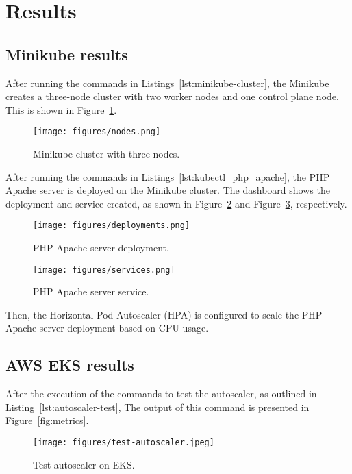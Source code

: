 \section{Results}
\subsection{Minikube results}
After running the commands in Listings~\ref{lst:minikube-cluster}, the Minikube creates a three-node cluster with two worker nodes and one control plane node.
This is shown in Figure~\ref{fig:minikube-cluster}.

\begin{figure}[!htbp]
  \centering
  \texttt{[image: figures/nodes.png]}
  \caption{Minikube cluster with three nodes.}
  \label{fig:minikube-cluster}
\end{figure}

After running the commands in Listings~\ref{lst:kubectl_php_apache}, the PHP Apache server is deployed on the Minikube cluster.
The dashboard shows the deployment and service created, as shown in Figure~\ref{fig:deployments} and Figure~\ref{fig:services}, respectively.

\begin{figure}[!htbp]
  \centering
  \texttt{[image: figures/deployments.png]}
  \caption{PHP Apache server deployment.}
  \label{fig:deployments}
\end{figure}

\begin{figure}[!htbp]
  \centering
  \texttt{[image: figures/services.png]}
  \caption{PHP Apache server service.}
  \label{fig:services}
\end{figure}

Then, the Horizontal Pod Autoscaler (HPA) is configured to scale the PHP Apache server deployment based on CPU usage.


\subsection{AWS EKS results}

After the execution of the commands to test the autoscaler, as outlined in Listing~\ref{lst:autoscaler-test}, The output of this command is presented in Figure~\ref{fig:metrics}.

\begin{figure}[!htbp]
  \centering
  \texttt{[image: figures/test-autoscaler.jpeg]}
  \caption{Test autoscaler on EKS.}
  \label{fig:test-autoscaler}
\end{figure}

